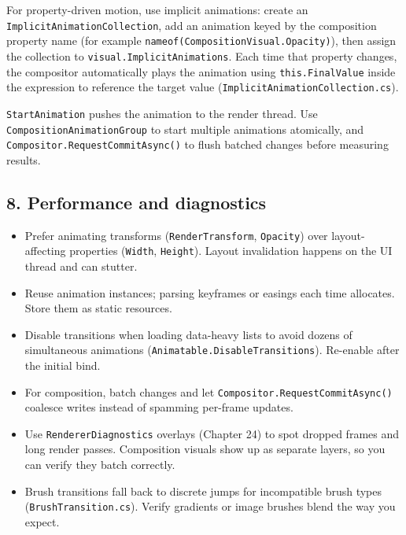 For property-driven motion, use implicit animations: create an
\passthrough{\lstinline!ImplicitAnimationCollection!}, add an animation
keyed by the composition property name (for example
\passthrough{\lstinline!nameof(CompositionVisual.Opacity)!}), then
assign the collection to
\passthrough{\lstinline!visual.ImplicitAnimations!}. Each time that
property changes, the compositor automatically plays the animation using
\passthrough{\lstinline!this.FinalValue!} inside the expression to
reference the target value
(\passthrough{\lstinline!ImplicitAnimationCollection.cs!}).

\passthrough{\lstinline!StartAnimation!} pushes the animation to the
render thread. Use \passthrough{\lstinline!CompositionAnimationGroup!}
to start multiple animations atomically, and
\passthrough{\lstinline!Compositor.RequestCommitAsync()!} to flush
batched changes before measuring results.

\subsection{8. Performance and
diagnostics}\label{performance-and-diagnostics}

\begin{itemize}
\tightlist
\item
  Prefer animating transforms
  (\passthrough{\lstinline!RenderTransform!},
  \passthrough{\lstinline!Opacity!}) over layout-affecting properties
  (\passthrough{\lstinline!Width!}, \passthrough{\lstinline!Height!}).
  Layout invalidation happens on the UI thread and can stutter.
\item
  Reuse animation instances; parsing keyframes or easings each time
  allocates. Store them as static resources.
\item
  Disable transitions when loading data-heavy lists to avoid dozens of
  simultaneous animations
  (\passthrough{\lstinline!Animatable.DisableTransitions!}). Re-enable
  after the initial bind.
\item
  For composition, batch changes and let
  \passthrough{\lstinline!Compositor.RequestCommitAsync()!} coalesce
  writes instead of spamming per-frame updates.
\item
  Use \passthrough{\lstinline!RendererDiagnostics!} overlays (Chapter
  24) to spot dropped frames and long render passes. Composition visuals
  show up as separate layers, so you can verify they batch correctly.
\item
  Brush transitions fall back to discrete jumps for incompatible brush
  types (\passthrough{\lstinline!BrushTransition.cs!}). Verify gradients
  or image brushes blend the way you expect.
\end{itemize}

